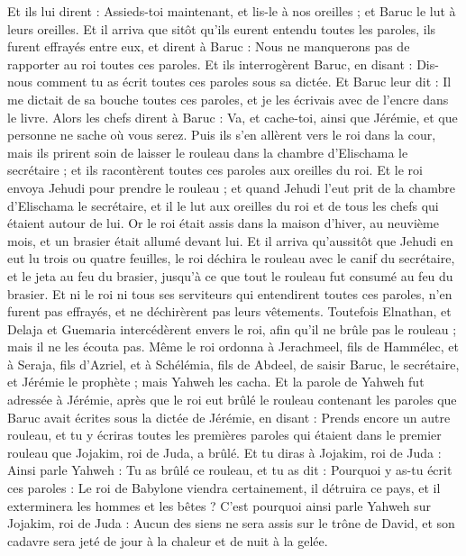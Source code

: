 \begin{multicols}{2}
Et ils lui dirent : Assieds-toi maintenant, et lis-le à nos oreilles ; et Baruc le lut à leurs oreilles.
Et il arriva que sitôt qu'ils eurent entendu toutes les paroles, ils furent effrayés entre eux, et dirent à Baruc : Nous ne manquerons pas de rapporter au roi toutes ces paroles.
Et ils interrogèrent Baruc, en disant : Dis-nous comment tu as écrit toutes ces paroles sous sa dictée.
Et Baruc leur dit : Il me dictait de sa bouche toutes ces paroles, et je les écrivais avec de l'encre dans le livre.
Alors les chefs dirent à Baruc : Va, et cache-toi, ainsi que Jérémie, et que personne ne sache où vous serez.
Puis ils s'en allèrent vers le roi dans la cour, mais ils prirent soin de laisser le rouleau dans la chambre d'Elischama le secrétaire ; et ils racontèrent toutes ces paroles aux oreilles du roi.
Et le roi envoya Jehudi pour prendre le rouleau ; et quand Jehudi l'eut prit de la chambre d'Elischama le secrétaire, et il le lut aux oreilles du roi et de tous les chefs qui étaient autour de lui.
Or le roi était assis dans la maison d'hiver, au neuvième mois, et un brasier était allumé devant lui.
Et il arriva qu'aussitôt que Jehudi en eut lu trois ou quatre feuilles, le roi déchira le rouleau avec le canif du secrétaire, et le jeta au feu du brasier, jusqu'à ce que tout le rouleau fut consumé au feu du brasier.
Et ni le roi ni tous ses serviteurs qui entendirent toutes ces paroles, n'en furent pas effrayés, et ne déchirèrent pas leurs vêtements.
Toutefois Elnathan, et Delaja et Guemaria intercédèrent envers le roi, afin qu'il ne brûle pas le rouleau ; mais il ne les écouta pas.
Même le roi ordonna à Jerachmeel, fils de Hammélec, et à Seraja, fils d'Azriel, et à Schélémia, fils de Abdeel, de saisir Baruc, le secrétaire, et Jérémie le prophète ; mais Yahweh les cacha.
Et la parole de Yahweh fut adressée à Jérémie, après que le roi eut brûlé le rouleau contenant les paroles que Baruc avait écrites sous la dictée de Jérémie, en disant :
Prends encore un autre rouleau, et tu y écriras toutes les premières paroles qui étaient dans le premier rouleau que Jojakim, roi de Juda, a brûlé.
Et tu diras à Jojakim, roi de Juda : Ainsi parle Yahweh : Tu as brûlé ce rouleau, et tu as dit : Pourquoi y as-tu écrit ces paroles : Le roi de Babylone viendra certainement, il détruira ce pays, et il exterminera les hommes et les bêtes ?
C'est pourquoi ainsi parle Yahweh sur Jojakim, roi de Juda : Aucun des siens ne sera assis sur le trône de David, et son cadavre sera jeté de jour à la chaleur et de nuit à la gelée.

\end{multicols}
